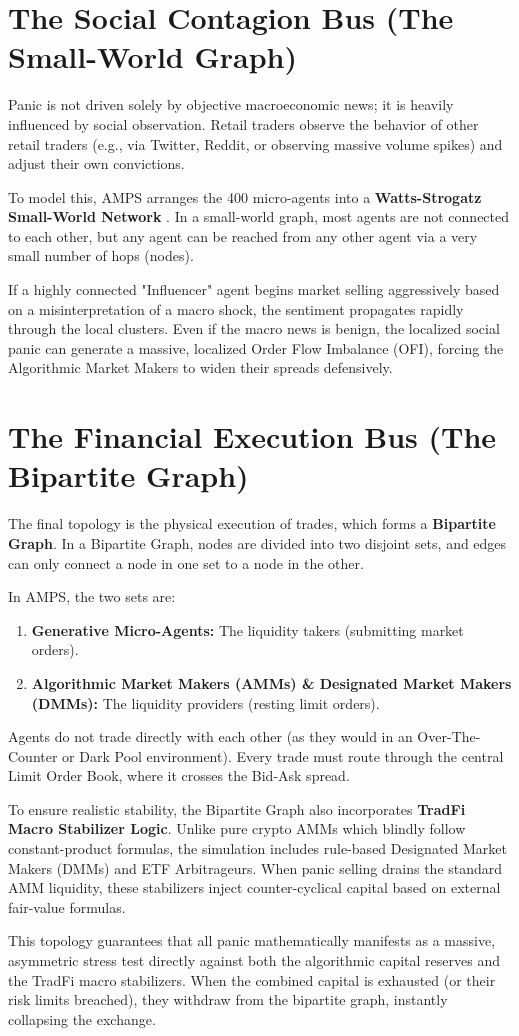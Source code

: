 \section{The Social Contagion Bus (The Small-World Graph)}

Panic is not driven solely by objective macroeconomic news; it is heavily influenced by social observation. Retail traders observe the behavior of other retail traders (e.g., via Twitter, Reddit, or observing massive volume spikes) and adjust their own convictions.

To model this, AMPS arranges the 400 micro-agents into a \textbf{Watts-Strogatz Small-World Network} \cite{park2023generative}. In a small-world graph, most agents are not connected to each other, but any agent can be reached from any other agent via a very small number of hops (nodes). 

If a highly connected "Influencer" agent begins market selling aggressively based on a misinterpretation of a macro shock, the sentiment propagates rapidly through the local clusters. Even if the macro news is benign, the localized social panic can generate a massive, localized Order Flow Imbalance (OFI), forcing the Algorithmic Market Makers to widen their spreads defensively.

\section{The Financial Execution Bus (The Bipartite Graph)}

The final topology is the physical execution of trades, which forms a \textbf{Bipartite Graph}. In a Bipartite Graph, nodes are divided into two disjoint sets, and edges can only connect a node in one set to a node in the other.

In AMPS, the two sets are:
\begin{enumerate}
    \item \textbf{Generative Micro-Agents:} The liquidity takers (submitting market orders).
    \item \textbf{Algorithmic Market Makers (AMMs) \& Designated Market Makers (DMMs):} The liquidity providers (resting limit orders).
\end{enumerate}

Agents do not trade directly with each other (as they would in an Over-The-Counter or Dark Pool environment). Every trade must route through the central Limit Order Book, where it crosses the Bid-Ask spread. 

To ensure realistic stability, the Bipartite Graph also incorporates \textbf{TradFi Macro Stabilizer Logic}. Unlike pure crypto AMMs which blindly follow constant-product formulas, the simulation includes rule-based Designated Market Makers (DMMs) and ETF Arbitrageurs. When panic selling drains the standard AMM liquidity, these stabilizers inject counter-cyclical capital based on external fair-value formulas.

This topology guarantees that all panic mathematically manifests as a massive, asymmetric stress test directly against both the algorithmic capital reserves and the TradFi macro stabilizers. When the combined capital is exhausted (or their risk limits breached), they withdraw from the bipartite graph, instantly collapsing the exchange.
